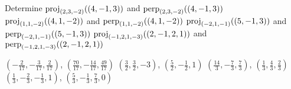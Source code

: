 
\begin{Exercise}[
name={},
title={}, 
difficulty=0,
origin={\cite{SM}}]
Determine
\Question $\proj{(4,-1,3)}{(2,3,-2)}$ and $\orth{(4,-1,3)}{(2,3,-2)}$
\Question $\proj{(4,1,-2)}{(1,1,-2)}$ and $\orth{(4,1,-2)}{(1,1,-2)}$
\Question $\proj{(5,-1,3)}{(-2,1,-1)}$ and $\orth{(5,-1,3)}{(-2,1,-1)}$
\Question $\proj{(2,-1,2,1)}{(-1,2,1,-3)}$ and $\orth{(2,-1,2,1)}{(-1,2,1,-3)}$
\end{Exercise}

\begin{Answer}
\Question $\left(-\frac{2}{17},-\frac{3}{17},\frac{2}{17}\right)$, $\left(\frac{70}{17},-\frac{14}{17},\frac{49}{17}\right)$
\Question $\left(\frac{3}{2},\frac{3}{2},-3\right)$, $\left(\frac{5}{2},-\frac{1}{2},1\right)$
\Question $\left(\frac{14}{3},-\frac{7}{3},\frac{7}{3}\right)$, $\left(\frac{1}{3},\frac{4}{3},\frac{2}{3}\right)$
\Question $\left(\frac{1}{3},-\frac{2}{3},-\frac{1}{3},1\right)$, $\left(\frac{5}{3},-\frac{1}{3},\frac{7}{3},0\right)$
\end{Answer}
